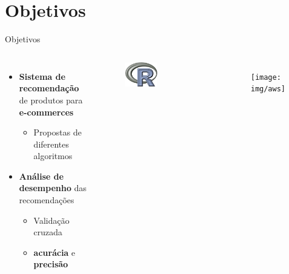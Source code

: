 \section[Objetivos]{Objetivos}
\begin{frame}{Objetivos}
\begin{columns}[c] 
\begin{itemize}
	\item \textbf{Sistema de recomendação} de produtos para \textbf{e-commerces}
	\begin{itemize}
		\item Propostas de diferentes algoritmos
	\end{itemize}
	\item \textbf{Análise de desempenho} das recomendações
	\begin{itemize}
		\item Validação cruzada
		\item \textbf{acurácia} e \textbf{precisão} 
	\end{itemize}
\end{itemize}

\begin{figure}[ht]
    \begin{center}
    \includegraphics[width=0.5\textwidth]{img/r}
    \end{center}
\end{figure}

\begin{figure}[ht]
    \begin{center}
    \texttt{[image: img/aws]}
    \end{center}
\end{figure}

\end{columns}
\end{frame}

